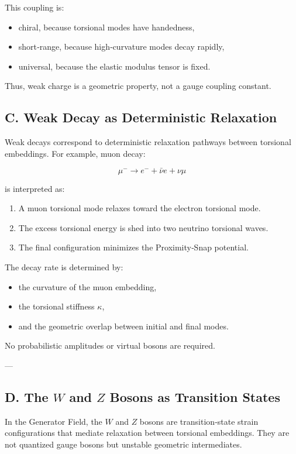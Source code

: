 \documentclass[reprint,amsmath,amssymb,aps,prl,floatfix]{revtex4-2}
\begin{document}
This coupling is:
\begin{itemize}
\item chiral, because torsional modes have handedness,  
\item short‑range, because high‑curvature modes decay rapidly,  
\item universal, because the elastic modulus tensor is fixed.
\end{itemize}

Thus, weak charge is a geometric property, not a gauge coupling constant.

\subsection{C. Weak Decay as Deterministic Relaxation}

Weak decays correspond to deterministic relaxation pathways between torsional embeddings.  
For example, muon decay:

\[
\mu^- \rightarrow e^- + \bar{\nu}e + \nu\mu
\]

is interpreted as:

\begin{enumerate}
\item A muon torsional mode relaxes toward the electron torsional mode.  
\item The excess torsional energy is shed into two neutrino torsional waves.  
\item The final configuration minimizes the Proximity‑Snap potential.
\end{enumerate}

The decay rate is determined by:

\begin{itemize}
\item the curvature of the muon embedding,  
\item the torsional stiffness \(\kappa\),  
\item and the geometric overlap between initial and final modes.
\end{itemize}

No probabilistic amplitudes or virtual bosons are required.

---

\subsection{D. The \(W\) and \(Z\) Bosons as Transition States}

In the Generator Field, the \(W\) and \(Z\) bosons are transition‑state strain configurations that mediate relaxation between torsional embeddings. They are not quantized gauge bosons but unstable geometric intermediates.
\end{document}
